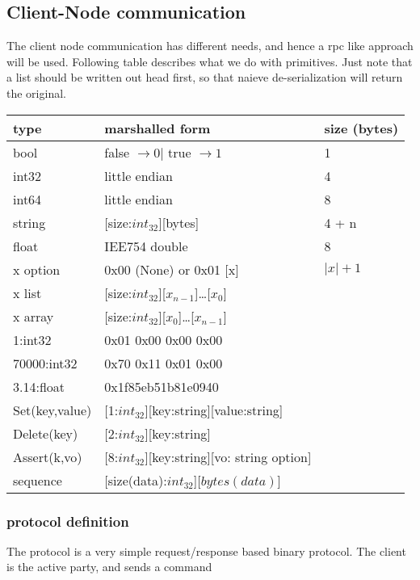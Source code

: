 \subsection{Client-Node communication}
The client node communication has different needs, and hence a rpc like approach will be used. Following table describes what we do with primitives.
Just note that a list should be written out head first, so that naieve de-serialization will return the original.
\begin{table}[ht]
\begin{tabular}{|l|l|l|}
\hline
type  &   marshalled form & size (bytes)          \\
\hline
bool        & false $\rightarrow 0 | $ true $ \rightarrow 1   $ & 1 \\
int32       & little endian          & 4             \\
int64       & little endian          & 8             \\
string      & [size:$int_{32}$][bytes] & 4 + n     \\
float       & IEE754 double       & 8             \\
x option    & 0x00 (None) or 0x01 [x] & $|x| + 1$ \\
x list      & [size:$int_{32}$][$x_{n-1}$]\ldots[$x_{0}$]       &\\
x array     & [size:$int_{32}$][$x_{0}$]\ldots[$x_{n-1}$]       &\\
\hline 
1:int32     & 0x01 0x00 0x00 0x00         & \\
70000:int32 & 0x70 0x11 0x01 0x00         & \\
3.14:float  & 0x1f85eb51b81e0940          & \\
\hline 
Set(key,value) & [1:$int_{32}$][key:string][value:string] & \\
Delete(key)  & [2:$int_{32}$][key:string]                  & \\
Assert(k,vo) & [8:$int_{32}$][key:string][vo: string option] & \\
sequence     & [size(data):$int_{32}$][$bytes(data)$]      & \\

\hline
\end{tabular}
\end{table}

\subsubsection{protocol definition}
The protocol is a very simple request/response based binary protocol.
The client is the active party, and sends a command
